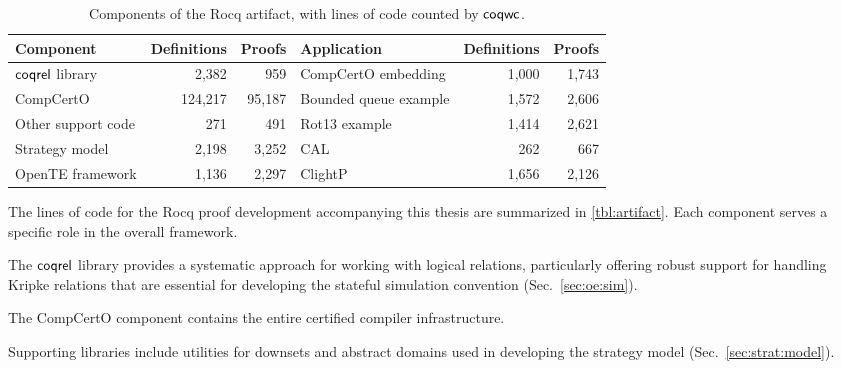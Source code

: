 \begin{table}
  \caption{Components of the Rocq artifact,
  with lines of code counted by $ \mathsf{coqwc} $.}
  \label{tbl:artifact}
  \begin{tabular}{lrrlrr}
    \toprule
    Component & \hspace{-5em} Definitions & Proofs &
    Application & \hspace{-5em} Definitions & Proofs \\
    \midrule
    $ \mathsf{coqrel} $ library & 2,382 & 959 &
    CompCertO embedding
    \hspace{-1em} & 1,000 & 1,743 \\
    CompCertO & 124,217 & 95,187 &
    Bounded queue example & 1,572 & 2,606 \\
    Other support code & 271 & 491 &
    Rot13 example & 1,414 & 2,621 \\
    Strategy model
    \hspace{-1em} & 2,198 & 3,252 &
    CAL & 262 & 667 \\

    OpenTE framework & 1,136 & 2,297 &
    ClightP & 1,656 & 2,126 \\

    \bottomrule
  \end{tabular}
\end{table}

The lines of code for the Rocq proof development
accompanying this thesis
are summarized in \autoref{tbl:artifact}.
Each component serves a specific role
in the overall framework.

The $ \mathsf{coqrel} $ library
provides a systematic approach
for working with logical relations,
particularly offering robust support for handling Kripke relations
that are essential
for developing the stateful simulation convention (Sec.~\ref{sec:oe:sim}).

The CompCertO component contains
the entire certified compiler infrastructure.

Supporting libraries include
utilities for downsets and abstract domains
used in developing the strategy model (Sec.~\ref{sec:strat:model}).

